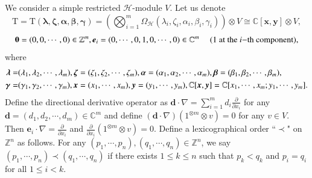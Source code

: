 \documentclass[12pt,reqno]{amsart}
\def\Z{\mathbb{Z}}
\def\N{\mathbb{N}}
\def\C{\mathbb{C}}
\numberwithin{equation}{section}
\begin{document}
 We consider a simple restricted $\mathcal{H}$-module $V$. 
Let us denote 
\[
    \mathrm{T}=\mathrm{T}(\boldsymbol{\lambda},\boldsymbol{\zeta},\boldsymbol{\alpha},\boldsymbol{\beta},\boldsymbol{\gamma})=\left(\bigotimes_{i=1}^{m}\Omega_{\mathcal{H}}(\lambda_i,\zeta_i, \alpha_i,\beta_i,\gamma_i)\right)\otimes V\cong\C[\boldsymbol{x},\boldsymbol{y}]\otimes V,
\] 
\[
    \boldsymbol{0}=(0,0,\cdots,0)\in\Z^m,\boldsymbol{e}_i=(0,\cdots,0,1,0,\cdots,0)\in\C^m\ \ \ \ \ (1\ {\rm{at\  the}}\      i{\rm{-th\  component}}), 
\]
where 
\begin{equation*}\label{formula 5.0.1}
\aligned
\boldsymbol{\lambda}=&(\lambda_1,\lambda_2,\cdots,\lambda_m),\boldsymbol{\zeta}=(\zeta_1,\zeta_2,\cdots,\zeta_m),
\boldsymbol{\alpha}=(\alpha_1,\alpha_2,\cdots,\alpha_m),
\boldsymbol{\beta}=(\beta_1,\beta_2,\cdots,\beta_m),\\
\boldsymbol{\gamma}=&(\gamma_1,\gamma_2,\cdots,\gamma_m),
\boldsymbol{x}=(x_1,\cdots,x_m),
\boldsymbol{y}=(y_1,\cdots,y_m),
\C[\boldsymbol{x},\boldsymbol{y}]=\C[x_1,\cdots,x_m;y_1,\cdots,y_m].
\endaligned
\end{equation*}
Define the directional derivative operator as $\boldsymbol{d}\cdot\nabla=\sum_{i=1}^md_i\frac{\partial}{\partial{x_i}}$
for any $\boldsymbol{d}=(d_1,d_2,\cdots,d_m)\in\C^m$ and define $(\boldsymbol{d}\cdot\nabla) (1^{\otimes m}\otimes v)=0$ for any $v\in V$. Then  $\boldsymbol{e}_i\cdot\nabla=\frac{\partial}{\partial{x_i}}$ and $\frac{\partial}{\partial{x_i}}(1^{\otimes m}\otimes v)=0$. Define a lexicographical order ``$\prec$" on $\mathbb{Z}^n$ as follows. For any 
$(p_1, \cdots, p_n), (q_1, \cdots, q_n) \in \mathbb{Z}^n$, we say 
$(p_1, \cdots, p_n) \prec (q_1, \cdots, q_n)$ if there exists $1\le k \le n$ such that 
$p_k < q_k$ and $p_i = q_i$ for all $1 \le i < k$.
\end{document}
